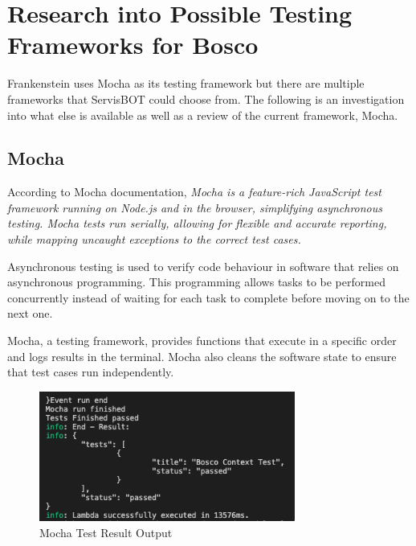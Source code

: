 \documentclass[12pt,a4paper,titlepage]{report}
\begin{document}
\section{Research into Possible Testing Frameworks for Bosco}

Frankenstein uses Mocha as its testing framework but there are multiple frameworks that ServisBOT could choose from. 
The following is an investigation into what else is available as well as a review of the current framework, Mocha.
\subsection{Mocha}

According to Mocha documentation, \textit{Mocha is a feature-rich JavaScript test framework running on Node.js and in the browser, simplifying asynchronous
testing. Mocha tests run serially, allowing for flexible and accurate reporting, while mapping uncaught
exceptions to the correct test cases.}\autocite{Mocha}

Asynchronous testing is used to verify code behaviour in software that relies on asynchronous programming. This programming allows tasks to be performed concurrently instead of waiting for each task to complete before moving on to the next one. 

Mocha, a testing framework, provides functions that execute in a specific order and logs results in the terminal. 
Mocha also cleans the software state to ensure that test cases run independently.

\begin{figure}[ht]
 \centering
 \includegraphics[width=0.75\textwidth,height=0.75\textwidth,keepaspectratio]{./diagrams/mocha_test_result.png}
 \caption{Mocha Test Result Output}
\end{figure}
\end{document}
